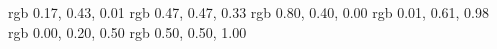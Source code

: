 
	\usepackage{color}
	\usepackage{listings}    
	\usepackage{courier}
	
	\definecolor{arduinoGreen}    {rgb} {0.17, 0.43, 0.01}
	\definecolor{arduinoGrey}     {rgb} {0.47, 0.47, 0.33}
	\definecolor{arduinoOrange}   {rgb} {0.80, 0.40, 0.00}
	\definecolor{arduinoBlue}     {rgb} {0.01, 0.61, 0.98}
	\definecolor{arduinoDarkBlue} {rgb} {0.00, 0.20, 0.50}
	\definecolor{FileColor}		  {rgb} {0.50, 0.50, 1.00} %
	
